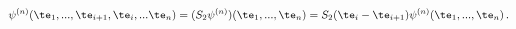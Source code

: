 \begin{equation*}
  \psi^{(n)}(\te_1,...,\te_{i+1},\te_i,...\te_n) = (S_2
  \psi^{(n)})(\te_1,...,\te_n) = S_2(\te_i-\te_{i+1})\psi^{(n)}(\te_1,...,\te_n)\,.
\end{equation*}

